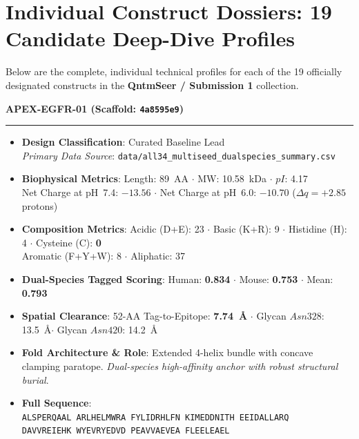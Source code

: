 \documentclass[11pt]{article}
\begin{document}
\section{Individual Construct Dossiers: 19 Candidate Deep-Dive Profiles}

Below are the complete, individual technical profiles for each of the 19 officially designated constructs in the \textbf{QntmSeer / Submission 1} collection.


\noindent\textbf{\color{navyblue}\large APEX-EGFR-01  \quad (Scaffold: \texttt{4a8595e9})} \\
\vspace{-0.4em}
\rule{\textwidth}{0.6pt}
\vspace{-0.2em}
\begin{itemize}
  \setlength{\itemsep}{2pt}
  \setlength{\parskip}{0pt}
  \item \textbf{Design Classification}: Curated Baseline Lead \\
    \textit{Primary Data Source}: \texttt{\small data/all34\_multiseed\_dualspecies\_summary.csv}
  \item \textbf{Biophysical Metrics}: Length: 89~AA $\cdot$ MW: 10.58~kDa $\cdot$ $pI$: 4.17 \\
    Net Charge at pH~7.4: $-13.56$ $\cdot$ Net Charge at pH~6.0: $-10.70$ ($\Delta q = +2.85$ protons)
  \item \textbf{Composition Metrics}: Acidic (D+E): 23 $\cdot$ Basic (K+R): 9 $\cdot$ Histidine (H): 4 $\cdot$ Cysteine (C): \textbf{0} \\
    Aromatic (F+Y+W): 8 $\cdot$ Aliphatic: 37
  \item \textbf{Dual-Species Tagged Scoring}: Human: \textbf{0.834} $\cdot$ Mouse: \textbf{0.753} $\cdot$ Mean: \textbf{0.793}
  \item \textbf{Spatial Clearance}: 52-AA Tag-to-Epitope: \textbf{7.74~\AA} $\cdot$ Glycan $Asn328$: 13.5~\AA $\cdot$ Glycan $Asn420$: 14.2~\AA
  \item \textbf{Fold Architecture \& Role}: Extended 4-helix bundle with concave clamping paratope. \textit{Dual-species high-affinity anchor with robust structural burial}.
  \item \textbf{Full Sequence}: \\
    \texttt{\small ALSPERQAAL ARLHELMWRA FYLIDRHLFN KIMEDDNITH EEIDALLARQ \\
    DAVVREIEHK WYEVRYEDVD PEAVVAEVEA FLEELEAEL}
\end{itemize}
\vspace{0.8em}
\end{document}
